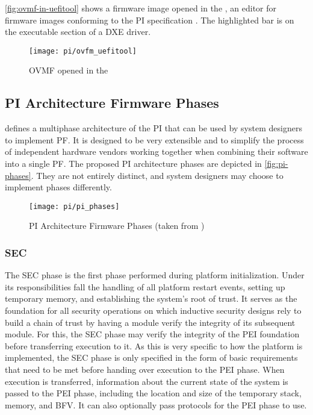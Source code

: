 \autoref{fig:ovmf-in-uefitool} shows a firmware image opened in the , an editor for firmware images conforming to the \ac{PI} specification \cite{uefitool}. The highlighted bar is on the executable section of a \acs{DXE} driver.

\begin{figure}[htb]%
    \centering%
    \texttt{[image: pi/ovfm\_uefitool]}%
    \caption[\acs{OVMF} opened in the ]{\acf{OVMF} opened in the }%
    \label{fig:ovmf-in-uefitool}%
\end{figure}


\subsection{\acs{PI} Architecture Firmware Phases}

\cite{pi-spec} defines a multiphase architecture of the \acl{PI} that can be used by system designers to implement \acl{PF}.
It is designed to be very extensible and to simplify the process of independent hardware vendors working together when combining their software into a single \ac{PF}.
The proposed \ac{PI} architecture phases are depicted in \autoref{fig:pi-phases}. They are not entirely distinct, and system designers may choose to implement phases differently.

\begin{figure}[htb]%
    \centering%
    \texttt{[image: pi/pi\_phases]}%
    \caption[\acs{PI} Architecture Firmware Phases]{\ac{PI} Architecture Firmware Phases (taken from \cite[Figure 2-1]{pi-spec})}%
    \label{fig:pi-phases}%
\end{figure}


\subsubsection{\acf{SEC}}

The \ac{SEC} phase is the first phase performed during platform initialization.
Under its responsibilities fall the handling of all platform restart events, setting up temporary memory, and establishing the system's root of trust.
It serves as the foundation for all security operations on which inductive security designs rely to build a chain of trust by having a module verify the integrity of its subsequent module.
For this, the \ac{SEC} phase may verify the integrity of the \ac{PEI} foundation before transferring execution to it.
As this is very specific to how the platform is implemented, the \ac{SEC} phase is only specified in the form of basic requirements that need to be met before handing over execution to the \ac{PEI} phase.
When execution is transferred, information about the current state of the system is passed to the \ac{PEI} phase, including the location and size of the temporary stack, memory, and \ac{BFV}.
It can also optionally pass protocols for the \ac{PEI} phase to use.

